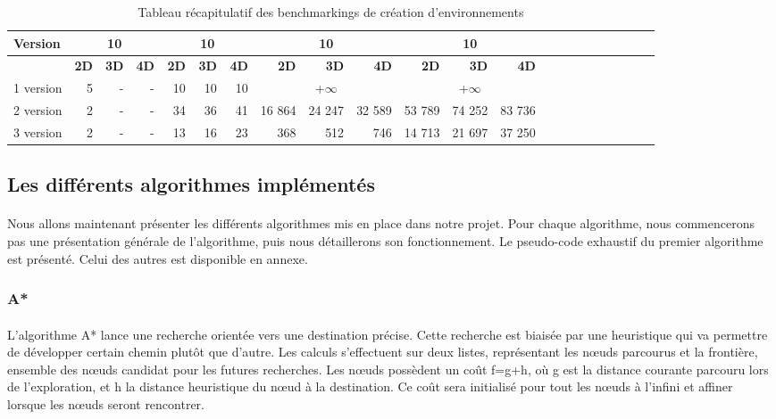 \documentclass[pidr]{tnreport}
\begin{document}
\begin{table}[h]
\begin{center}
   \begin{tabular}{| l || r | r | r || r | r | r || r | r | r || r | r | r || r | r | r || r | r | r || r | r | r |}
     \hline
      \textbf{Version} & \multicolumn{3}{c||}{\textbf{10\up{2}}} & \multicolumn{3}{c||}{\textbf{10\up{4}}} & \multicolumn{3}{c||}{\textbf{10\up{6}}} & \multicolumn{3}{c||}{\textbf{10\up{7}}} \\
     \hline
     \cline{2-5}
    & \textbf{2D} & \textbf{3D} & \textbf{4D} & \textbf{2D} & \textbf{3D} & \textbf{4D} & \textbf{2D} & \textbf{3D} & \textbf{4D} & \textbf{2D} & \textbf{3D} & \textbf{4D}\\ \hline
     1\up{ère} version & 5 & - & - & ~10\up{7} & ~10\up{8} & ~10\up{8} & \multicolumn{3}{c||}{+$\infty$}  & \multicolumn{3}{c||}{+$\infty$}   \\ \hline
     2\up{ème} version & 2 & - & - & 34 & 36 & 41 & 16 864 & 24 247 & 32 589 & 53 789 & 74 252 & 83 736  \\ \hline
     3\up{ème} version & 2 & - & - & 13 & 16 & 23 & 368 & 512 & 746  & 14 713 & 21 697 & 37 250 \\ \hline
   \end{tabular}
 \end{center}
 \caption{Tableau récapitulatif des benchmarkings de création d'environnements  \label{label_env}}
\end{table}

	\subsection{Les différents algorithmes implémentés}

\paragraph{}
Nous allons maintenant présenter les différents algorithmes mis en place dans notre projet. Pour chaque algorithme, nous commencerons pas une présentation générale de l'algorithme, puis nous détaillerons son fonctionnement. Le pseudo-code exhaustif du premier algorithme est présenté. Celui des autres est disponible en annexe.
	
\subsubsection{A*}	
\paragraph{}
L'algorithme A* lance une recherche orientée vers une destination précise. Cette recherche est biaisée par une heuristique qui va permettre de développer certain chemin plutôt que d'autre. Les calculs s'effectuent sur deux listes, représentant les nœuds parcourus et la frontière, ensemble des nœuds candidat pour les futures recherches. Les nœuds possèdent un coût f=g+h, où g est la distance courante parcouru lors de l'exploration, et h la distance heuristique du nœud à la destination. Ce coût sera initialisé pour tout les nœuds à l'infini et affiner lorsque les nœuds seront rencontrer. \newline
\end{document}
